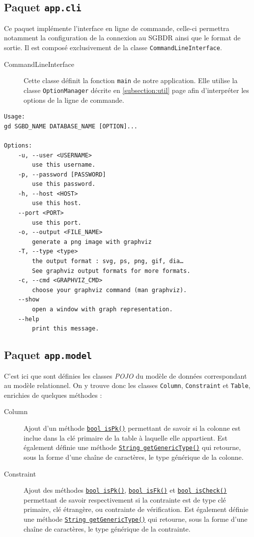 \subsection{Paquet \texttt{app.cli}}

Ce paquet implémente l'interface en ligne de commande, celle-ci permettra notamment la configuration de la connexion au SGBDR ainsi que le format de sortie. Il est composé exclusivement de la classe \texttt{CommandLineInterface}.

\begin{description}
\item[CommandLineInterface] Cette classe définit la fonction \texttt{main} de notre application. Elle utilise la classe \texttt{OptionManager} décrite en \ref{subsection:util} page \pageref{subsection:util} afin d'interpréter les options de la ligne de commande.  
\end{description}

\begin{verbatim}
Usage:
gd SGBD_NAME DATABASE_NAME [OPTION]...

Options:
    -u, --user <USERNAME>
        use this username.
    -p, --password [PASSWORD]
        use this password.
    -h, --host <HOST>
        use this host.
    --port <PORT>
        use this port.
    -o, --output <FILE_NAME>
        generate a png image with graphviz
    -T, --type <type>
        the output format : svg, ps, png, gif, dia… 
        See graphviz output formats for more formats.
    -c, --cmd <GRAPHVIZ_CMD>
        choose your graphviz command (man graphviz).
    --show 
        open a window with graph representation.
    --help
        print this message.
\end{verbatim}


\subsection{Paquet \texttt{app.model}}
C'est ici que sont définies les classes \emph{POJO} du modèle de données correspondant au modèle relationnel. On y trouve donc les classes \texttt{Column}, \texttt{Constraint} et \texttt{Table}, enrichies de quelques méthodes :

\begin{description}

\item[Column] Ajout d'un méthode \texttt{\underline{bool isPk()}} permettant de savoir si la colonne est inclue dans la clé primaire de la table à laquelle elle appartient. Est également définie une méthode \texttt{\underline{String getGenericType()}} qui retourne, sous la forme d'une chaîne de caractères, le type générique de la colonne.

\item[Constraint] Ajout des méthodes \texttt{\underline{bool isPk()}}, \texttt{\underline{bool isFk()}} et \texttt{\underline{bool isCheck()}} permettant de savoir respectivement si la contrainte est de type clé primaire, clé étrangère, ou contrainte de vérification. Est également définie une méthode \texttt{\underline{String getGenericType()}} qui retourne, sous la forme d'une chaîne de caractères, le type générique de la contrainte.
\end{description}

